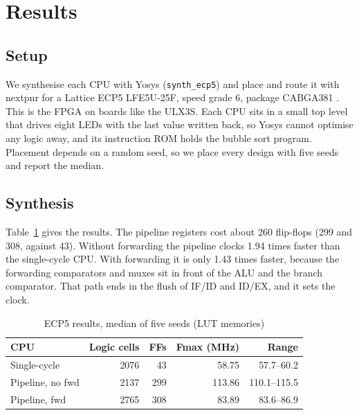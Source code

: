 \section{Results}
\label{sec:results}

\subsection{Setup}
We synthesise each CPU with Yosys \cite{yosys} (\texttt{synth\_ecp5}) and
place and route it with nextpnr \cite{nextpnr} for a Lattice ECP5 LFE5U-25F,
speed grade 6, package CABGA381 \cite{ecp5}. This is the FPGA on boards like
the ULX3S. Each CPU sits in a small top level that drives eight LEDs with the
last value written back, so Yosys cannot optimise any logic away, and its
instruction ROM holds the bubble sort program. Placement depends on a random
seed, so we place every design with five seeds and report the median.

\subsection{Synthesis}
Table~\ref{tab:synth} gives the results. The pipeline registers cost about
260 flip-flops (299 and 308, against 43). Without forwarding the pipeline
clocks 1.94 times faster than the single-cycle CPU. With forwarding it is only
1.43 times faster, because the forwarding comparators and muxes sit in front
of the ALU and the branch comparator. That path ends in the flush of IF/ID and
ID/EX, and it sets the clock.

\begin{table}[t]
\centering
\caption{ECP5 results, median of five seeds (LUT memories)}
\label{tab:synth}
\small
\setlength{\tabcolsep}{3pt}
\begin{tabular}{@{}lrrrr@{}}
\toprule
CPU & Logic cells & FFs & Fmax (MHz) & Range \\
\midrule
Single-cycle & 2076 & 43 & 58.75 & 57.7--60.2 \\
Pipeline, no fwd & 2137 & 299 & 113.86 & 110.1--115.5 \\
Pipeline, fwd & 2765 & 308 & 83.89 & 83.6--86.9 \\
\bottomrule
\end{tabular}
\end{table}

